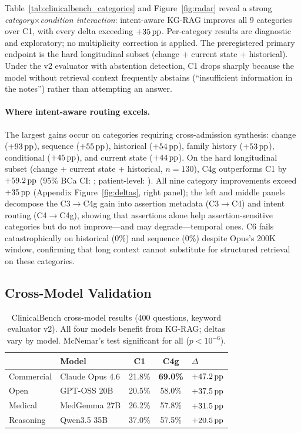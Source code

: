 Table~\ref{tab:clinicalbench_categories} and Figure~\ref{fig:radar} reveal a strong \emph{category$\times$condition interaction}: intent-aware KG-RAG improves all 9 categories over C1, with every delta exceeding $+35\,\text{pp}$.
Per-category results are diagnostic and exploratory; no multiplicity correction is applied.
The preregistered primary endpoint is the hard longitudinal subset (change + current state + historical).
Under the v2 evaluator with abstention detection, C1 drops sharply because the model without retrieval context frequently abstains (``insufficient information in the notes'') rather than attempting an answer.

\paragraph{Where intent-aware routing excels.}
\begin{sloppypar}
The largest gains occur on categories requiring cross-admission synthesis: change ($+93\,\text{pp}$), sequence ($+55\,\text{pp}$), historical ($+54\,\text{pp}$), family history ($+53\,\text{pp}$), conditional ($+45\,\text{pp}$), and current state ($+44\,\text{pp}$).
On the hard longitudinal subset (change + current state + historical, $n=130$), C4g outperforms C1 by $+59.2\,\text{pp}$ (95\% BCa CI: \ci{+49.2\pp}{+67.7\pp}; patient-level: \ci{+48.6\pp}{+69.4\pp}).
All nine category improvements exceed $+35\,\text{pp}$ (Appendix Figure~\ref{fig:deltas}, right panel); the left and middle panels decompose the C3$\rightarrow$C4g gain into assertion metadata (C3$\rightarrow$C4) and intent routing (C4$\rightarrow$C4g), showing that assertions alone help assertion-sensitive categories but do not improve---and may degrade---temporal ones.
C6 fails catastrophically on historical (0\%) and sequence (0\%) despite Opus's 200K window, confirming that long context cannot substitute for structured retrieval on these categories.
\end{sloppypar}

\subsection{Cross-Model Validation}
\label{sec:results:crossmodel}

\begin{table}[t]
\centering
\caption{ClinicalBench cross-model results (400 questions, keyword evaluator v2). All four models benefit from KG-RAG; deltas vary by model. McNemar's test significant for all ($p < 10^{-6}$).}
\label{tab:crossmodel}
\small
\begin{tabular}{@{}llccl@{}}
\toprule
& Model & C1 & C4g & $\Delta$ \\
\midrule
Commercial & Claude Opus 4.6 & 21.8\% & \textbf{69.0\%} & $+47.2\,\text{pp}$ \\
Open & GPT-OSS 20B & 20.5\% & 58.0\% & $+37.5\,\text{pp}$ \\
Medical & MedGemma 27B & 26.2\% & 57.8\% & $+31.5\,\text{pp}$ \\
Reasoning & Qwen3.5 35B & 37.0\% & 57.5\% & $+20.5\,\text{pp}$ \\
\bottomrule
\end{tabular}
\end{table}

